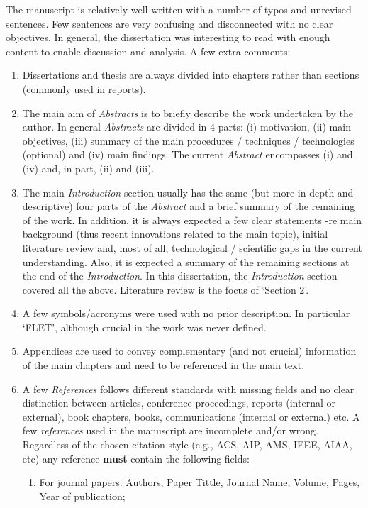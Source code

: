 \documentclass[14pt,twoside]{report}
\begin{document}
The manuscript is relatively well-written with a number of typos and unrevised sentences. Few sentences are very confusing and disconnected with no clear objectives. In general, the dissertation was interesting to read with enough content to enable discussion and analysis.  A few extra comments:
\begin{enumerate}
%
\item Dissertations and thesis are always divided into chapters rather than sections (commonly used in reports).
%
\item The main aim of {\it Abstracts} is to briefly describe the work undertaken by the author. In general {\it Abstracts} are divided in 4 parts: (i) motivation, (ii) main objectives, (iii) summary of the main procedures / techniques / technologies (optional) and (iv) main findings. The current {\it Abstract} encompasses (i) and (iv) and, in part, (ii) and (iii).
%
\item The main {\it Introduction} section usually has the same (but more in-depth and descriptive) four parts of the {\it Abstract} and a brief summary of the remaining of the work. In addition, it is always expected a few clear statements -re main background (thus recent innovations related to the main topic), initial literature review and, most of all, technological / scientific gaps in the current understanding. Also, it is expected a summary of the remaining sections at the end of the {\it Introduction}. In this dissertation, the {\it Introduction} section covered all the above. Literature review is the focus of `Section 2'. 
%
\item A few symbols/acronyms were used with no prior description. In particular `FLET', although crucial in the work was never defined.
%
\item Appendices are used to convey complementary (and not crucial) information of the main chapters and need to be referenced in the main text.
%
\item A few {\it References} follows different standards with missing fields and no clear distinction between articles, conference proceedings, reports (internal or external), book chapters, books, communications (internal or external) etc.  A few {\it references} used in the manuscript are incomplete and/or wrong. Regardless of the chosen citation style (e.g., ACS, AIP, AMS, IEEE, AIAA, etc) any reference {\bf must} contain the following fields: 
\begin{enumerate}
\item For journal papers: Authors, Paper Tittle, Journal Name, Volume, Pages, Year of publication;

\end{enumerate}
\end{enumerate}
\end{document}
